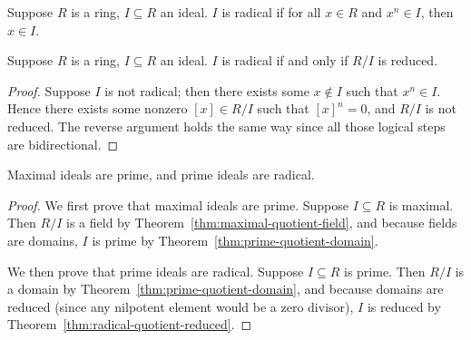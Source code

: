 \begin{definition}
    Suppose \(R\) is a ring, \(I \subseteq R\) an ideal.
    \(I\) is radical if for all \(x \in R\) and \(x^n \in I\), then \(x \in I\).
\end{definition}
\begin{theorem}\label{thm:radical-quotient-reduced}
    Suppose \(R\) is a ring, \(I \subseteq R\) an ideal.
    \(I\) is radical if and only if \(R/I\) is reduced.
\end{theorem}
\begin{proof}
    Suppose \(I\) is not radical;
    then there exists some \(x \notin I\) such that \(x^n \in I\).
    Hence there exists some nonzero \([x] \in R/I\) such that \({[x]}^n = 0\),
    and \(R/I\) is not reduced.
    The reverse argument holds the same way since all those logical steps are bidirectional.
\end{proof}

\begin{theorem}
    Maximal ideals are prime, and prime ideals are radical.
\end{theorem}
\begin{proof}
    We first prove that maximal ideals are prime.
    Suppose \(I \subseteq R\) is maximal.
    Then \(R/I\) is a field by Theorem~\ref{thm:maximal-quotient-field},
    and because fields are domains,
    \(I\) is prime by Theorem~\ref{thm:prime-quotient-domain}.

    We then prove that prime ideals are radical.
    Suppose \(I \subseteq R\) is prime.
    Then \(R/I\) is a domain by Theorem~\ref{thm:prime-quotient-domain},
    and because domains are reduced (since any nilpotent element would be a zero divisor),
    \(I\) is reduced by Theorem~\ref{thm:radical-quotient-reduced}.
\end{proof}

